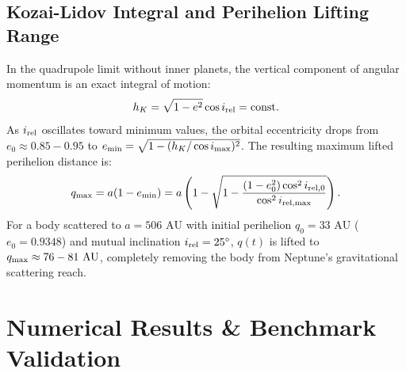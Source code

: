 \documentclass[11pt,a4paper]{article}
\begin{document}
\subsection{Kozai-Lidov Integral and Perihelion Lifting Range}
In the quadrupole limit without inner planets, the vertical component of angular momentum is an exact integral of motion:
\begin{equation}
h_K = \sqrt{1 - e^2} \cos i_{\rm rel} = \text{const}.
\end{equation}
As $i_{\rm rel}$ oscillates toward minimum values, the orbital eccentricity drops from $e_0 \approx 0.85 - 0.95$ to $e_{\rm min} = \sqrt{1 - (h_K / \cos i_{\rm max})^2}$. The resulting maximum lifted perihelion distance is:
\begin{equation}
q_{\rm max} = a (1 - e_{\rm min}) = a \left( 1 - \sqrt{1 - \frac{(1 - e_0^2) \cos^2 i_{\rm rel,0}}{\cos^2 i_{\rm rel,max}}} \right).
\end{equation}
For a body scattered to $a = 506\text{ AU}$ with initial perihelion $q_0 = 33\text{ AU}$ ($e_0 = 0.9348$) and mutual inclination $i_{\rm rel} = 25^\circ$, $q(t)$ is lifted to $q_{\rm max} \approx 76 - 81\text{ AU}$, completely removing the body from Neptune's gravitational scattering reach.

\section{Numerical Results \& Benchmark Validation}
\end{document}
